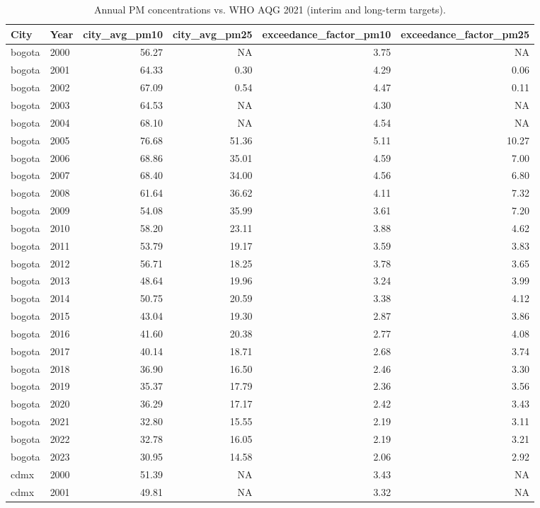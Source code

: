 \begin{table}[!htbp]\centering
\caption{Annual PM concentrations vs. WHO AQG 2021 (interim and long-term targets).}
\label{tab:who_exceedances}
\begin{tabular}{ll
rrrr
}
\toprule
City & Year & city_avg_pm10 & city_avg_pm25 & exceedance_factor_pm10 & exceedance_factor_pm25
\\
\midrule
bogota & 2000 & 56.27 &  NA & 3.75 &  NA \\
bogota & 2001 & 64.33 & 0.30 & 4.29 & 0.06 \\
bogota & 2002 & 67.09 & 0.54 & 4.47 & 0.11 \\
bogota & 2003 & 64.53 &  NA & 4.30 &  NA \\
bogota & 2004 & 68.10 &  NA & 4.54 &  NA \\
bogota & 2005 & 76.68 & 51.36 & 5.11 & 10.27 \\
bogota & 2006 & 68.86 & 35.01 & 4.59 & 7.00 \\
bogota & 2007 & 68.40 & 34.00 & 4.56 & 6.80 \\
bogota & 2008 & 61.64 & 36.62 & 4.11 & 7.32 \\
bogota & 2009 & 54.08 & 35.99 & 3.61 & 7.20 \\
bogota & 2010 & 58.20 & 23.11 & 3.88 & 4.62 \\
bogota & 2011 & 53.79 & 19.17 & 3.59 & 3.83 \\
bogota & 2012 & 56.71 & 18.25 & 3.78 & 3.65 \\
bogota & 2013 & 48.64 & 19.96 & 3.24 & 3.99 \\
bogota & 2014 & 50.75 & 20.59 & 3.38 & 4.12 \\
bogota & 2015 & 43.04 & 19.30 & 2.87 & 3.86 \\
bogota & 2016 & 41.60 & 20.38 & 2.77 & 4.08 \\
bogota & 2017 & 40.14 & 18.71 & 2.68 & 3.74 \\
bogota & 2018 & 36.90 & 16.50 & 2.46 & 3.30 \\
bogota & 2019 & 35.37 & 17.79 & 2.36 & 3.56 \\
bogota & 2020 & 36.29 & 17.17 & 2.42 & 3.43 \\
bogota & 2021 & 32.80 & 15.55 & 2.19 & 3.11 \\
bogota & 2022 & 32.78 & 16.05 & 2.19 & 3.21 \\
bogota & 2023 & 30.95 & 14.58 & 2.06 & 2.92 \\
cdmx & 2000 & 51.39 &  NA & 3.43 &  NA \\
cdmx & 2001 & 49.81 &  NA & 3.32 &  NA \\

\end{tabular}
\end{table}
